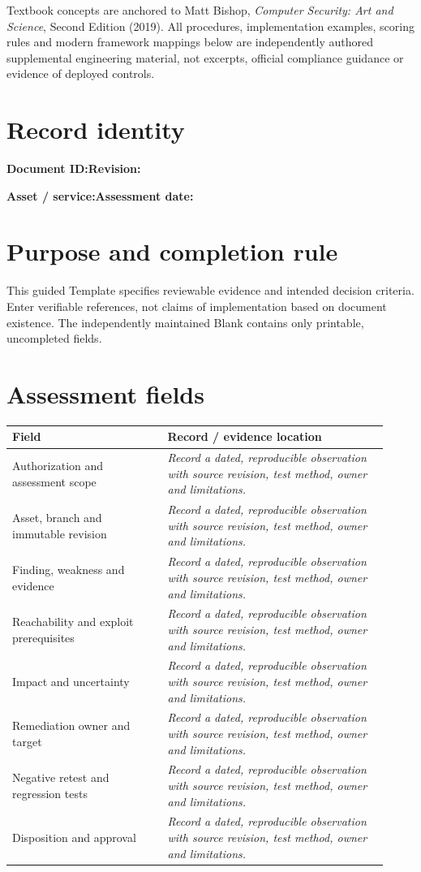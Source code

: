 \documentclass[10pt,letterpaper]{article}
\begin{document}
\makedoctocpage
\begin{notebox}
Textbook concepts are anchored to Matt Bishop, \emph{Computer Security: Art and Science}, Second Edition (2019). All procedures, implementation examples, scoring rules and modern framework mappings below are independently authored supplemental engineering material, not excerpts, official compliance guidance or evidence of deployed controls.
\end{notebox}
\section{Record identity}
\textbf{Document ID:}\enspace\hrulefill\quad\textbf{Revision:}\enspace\hrulefill
\par\medskip\textbf{Asset / service:}\enspace\hrulefill\quad\textbf{Assessment date:}\enspace\hrulefill
\section{Purpose and completion rule}
This guided Template specifies reviewable evidence and intended decision criteria. Enter verifiable references, not claims of implementation based on document existence. The independently maintained Blank contains only printable, uncompleted fields.
\section{Assessment fields}
\renewcommand{\arraystretch}{1.8}
\begin{longtable}{@{}p{0.38\linewidth}p{0.54\linewidth}@{}}
\toprule\textbf{Field}&\textbf{Record / evidence location}\\\midrule\endhead
Authorization and assessment scope & \emph{Record a dated, reproducible observation with source revision, test method, owner and limitations.}\\\midrule
Asset, branch and immutable revision & \emph{Record a dated, reproducible observation with source revision, test method, owner and limitations.}\\\midrule
Finding, weakness and evidence & \emph{Record a dated, reproducible observation with source revision, test method, owner and limitations.}\\\midrule
Reachability and exploit prerequisites & \emph{Record a dated, reproducible observation with source revision, test method, owner and limitations.}\\\midrule
Impact and uncertainty & \emph{Record a dated, reproducible observation with source revision, test method, owner and limitations.}\\\midrule
Remediation owner and target & \emph{Record a dated, reproducible observation with source revision, test method, owner and limitations.}\\\midrule
Negative retest and regression tests & \emph{Record a dated, reproducible observation with source revision, test method, owner and limitations.}\\\midrule
Disposition and approval & \emph{Record a dated, reproducible observation with source revision, test method, owner and limitations.}\\\midrule
\bottomrule\end{longtable}
\end{document}
